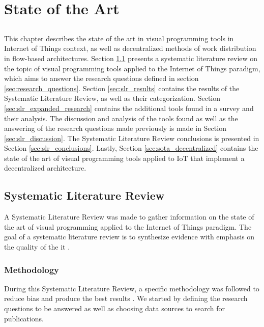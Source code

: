 \chapter{State of the Art} \label{chap:sota} \minitoc

\section*{}


This chapter describes the state of the art in visual programming tools in Internet of Things context, as well as decentralized methods of work distribution in flow-based architectures. Section \ref{sec:slr} presents a systematic literature review on the topic of visual programming tools applied to the Internet of Things paradigm, which aims to answer the research questions defined in section \ref{sec:research_questions}. Section \ref{sec:slr_results} contains the results of the Systematic Literature Review, as well as their categorization. Section \ref{sec:slr_expanded_research} contains the additional tools found in a survey and their analysis. The discussion and analysis of the tools found as well as the answering of the research questions made previously is made in Section \ref{sec:slr_discussion}. The Systematic Literature Review conclusions is presented in Section \ref{sec:slr_conclusions}. Lastly, Section \ref{sec:sota_decentralized} contains the state of the art of visual programming tools applied to IoT that implement a decentralized architecture.

\section{Systematic Literature Review}\label{sec:slr}

A Systematic Literature Review was made to gather information on the state of the art of visual programming applied to the Internet of Things paradigm. The goal of a systematic literature review is to synthesize evidence with emphasis on the quality of the it \cite{SLR_guidelines}.

\subsection{Methodology}\label{sec:methodology}

During this Systematic Literature Review, a specific methodology was followed to reduce bias and produce the best results \cite{SLR_guidelines}.
We started by defining the research questions to be answered as well as choosing data sources to search for publications.

